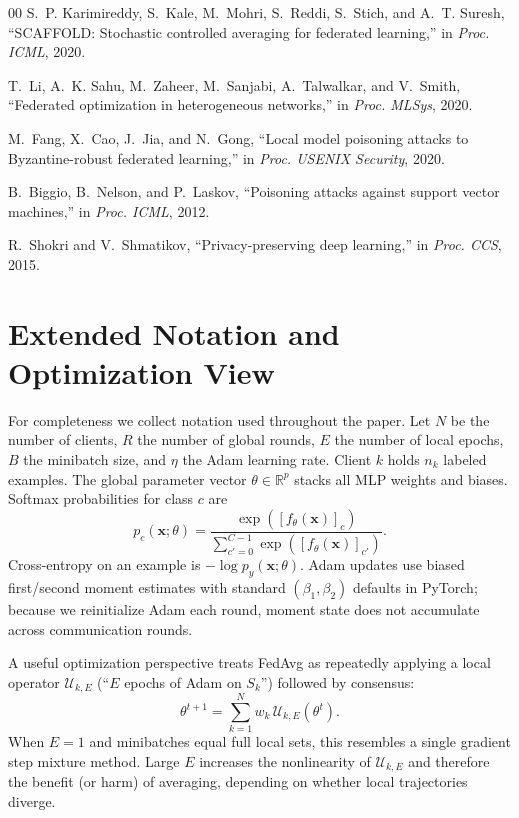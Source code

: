 \documentclass[journal]{IEEEtran}
\begin{document}
\begin{thebibliography}{00}
S.~P. Karimireddy, S.~Kale, M.~Mohri, S.~Reddi, S.~Stich, and A.~T. Suresh,
``SCAFFOLD: Stochastic controlled averaging for federated learning,''
in \emph{Proc. ICML}, 2020.

T.~Li, A.~K. Sahu, M.~Zaheer, M.~Sanjabi, A.~Talwalkar, and V.~Smith,
``Federated optimization in heterogeneous networks,''
in \emph{Proc. MLSys}, 2020.

M.~Fang, X.~Cao, J.~Jia, and N.~Gong,
``Local model poisoning attacks to Byzantine-robust federated learning,''
in \emph{Proc. USENIX Security}, 2020.

B.~Biggio, B.~Nelson, and P.~Laskov,
``Poisoning attacks against support vector machines,''
in \emph{Proc. ICML}, 2012.

R.~Shokri and V.~Shmatikov,
``Privacy-preserving deep learning,''
in \emph{Proc. CCS}, 2015.
\end{thebibliography}

\appendices

\section{Extended Notation and Optimization View}
\label{app:notation}
For completeness we collect notation used throughout the paper. Let $N$ be the number of clients, $R$ the number of global rounds, $E$ the number of local epochs, $B$ the minibatch size, and $\eta$ the Adam learning rate. Client $k$ holds $n_k$ labeled examples. The global parameter vector $\theta\in\mathbb{R}^{p}$ stacks all MLP weights and biases. Softmax probabilities for class $c$ are
\begin{equation}
p_c(\mathbf{x};\theta)=\frac{\exp([f_{\theta}(\mathbf{x})]_{c})}{\sum_{c'=0}^{C-1}\exp([f_{\theta}(\mathbf{x})]_{c'})}.
\end{equation}
Cross-entropy on an example is $-\log p_y(\mathbf{x};\theta)$. Adam updates use biased first/second moment estimates with standard $(\beta_1,\beta_2)$ defaults in PyTorch; because we reinitialize Adam each round, moment state does not accumulate across communication rounds.

A useful optimization perspective treats FedAvg as repeatedly applying a local operator $\mathcal{U}_{k,E}$ (``$E$ epochs of Adam on $S_k$'') followed by consensus:
\begin{equation}
\theta^{t+1}=\sum_{k=1}^{N}w_k\,\mathcal{U}_{k,E}(\theta^{t}).
\end{equation}
When $E=1$ and minibatches equal full local sets, this resembles a single gradient step mixture method. Large $E$ increases the nonlinearity of $\mathcal{U}_{k,E}$ and therefore the benefit (or harm) of averaging, depending on whether local trajectories diverge.
\end{document}
